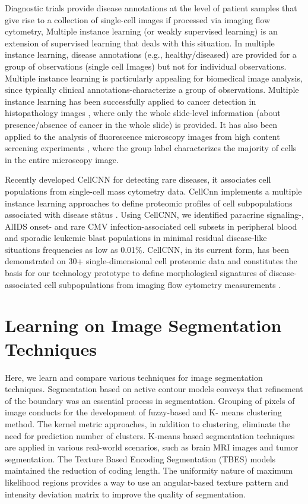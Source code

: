 Diagnostic trials provide disease annotations at the level of patient samples that give rise to a collection of single-cell images if processed via imaging flow cytometry, Multiple instance learning (or weakly supervised learning) is an extension of supervised learning that deals with this situation.  In multiple instance learning\cite{5}, disease annotations (e.g., healthy/diseased) are provided for a group of observations (single cell Images) but not for individual observations. Multiple instance learning is particularly appealing for biomedical image analysis, since typically clinical annotations-characterize a group of observations. Multiple instance learning has been successfully applied to cancer detection in histopathology images \cite{8}, where only the whole slide-level information (about presence/absence of cancer in the whole slide) is provided. It has also been applied to the analysis of fluorescence microscopy images from high content screening experiments \cite{9}, where the group label characterizes the majority of cells in the entire microscopy image. 


Recently developed CellCNN \cite{3} for detecting rare diseases, it associates cell populations from single-cell mass cytometry data. CellCnn implements a multiple instance learning approaches to define proteomic profiles of cell subpopulations associated with disease stâtus \cite{3}. Using CellCNN, we identified paracrine signaling-, AlIDS onset- and rare CMV infection-associated cell subsets in peripheral blood and sporadic leukemic blast populations in minimal residual disease-like situations frequencies as low as 0.01\%. CellCNN, in its current form, has been demonstrated on 30+ single-dimensional cell proteomic data and constitutes the basis for our technology prototype to define morphological signatures of disease-associated cell subpopulations from imaging flow cytometry measurements \cite{3}.




\section{Learning on Image Segmentation Techniques }

Here, we learn and compare various techniques for image segmentation techniques. Segmentation based on active contour models conveys that refinement of the boundary was an essential process in segmentation. Grouping of pixels of image conducts for the development of fuzzy-based and K- means clustering method. The kernel metric approaches, in addition to clustering, eliminate the need for prediction number of clusters. K-means based segmentation techniques are applied in various real-world scenarios, such as brain MRI images and tumor segmentation. The Texture Based Encoding Segmentation (TBES) models maintained the reduction of coding length. The uniformity nature of maximum likelihood regions provides a way to use an angular-based texture pattern and intensity deviation matrix to improve the quality of segmentation.\cite{taneja} 

